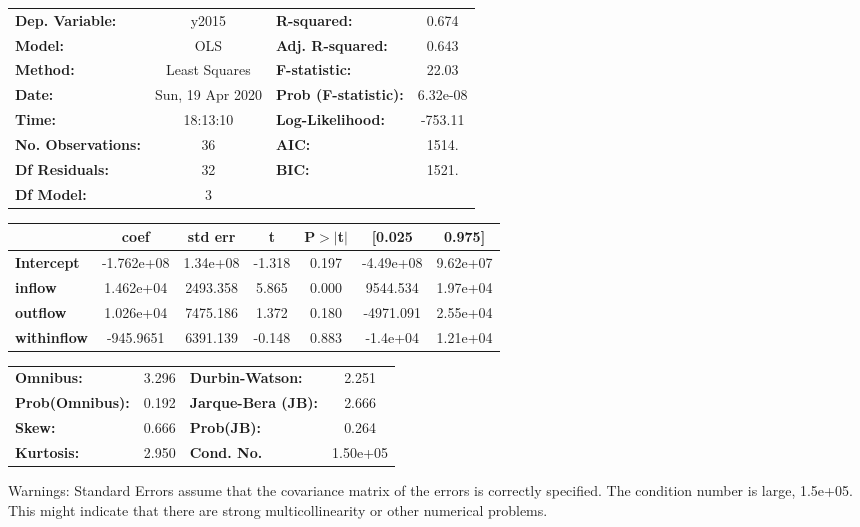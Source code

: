 \begin{center}
\begin{tabular}{lclc}
\toprule
\textbf{Dep. Variable:}    &      y2015       & \textbf{  R-squared:         } &     0.674   \\
\textbf{Model:}            &       OLS        & \textbf{  Adj. R-squared:    } &     0.643   \\
\textbf{Method:}           &  Least Squares   & \textbf{  F-statistic:       } &     22.03   \\
\textbf{Date:}             & Sun, 19 Apr 2020 & \textbf{  Prob (F-statistic):} &  6.32e-08   \\
\textbf{Time:}             &     18:13:10     & \textbf{  Log-Likelihood:    } &   -753.11   \\
\textbf{No. Observations:} &          36      & \textbf{  AIC:               } &     1514.   \\
\textbf{Df Residuals:}     &          32      & \textbf{  BIC:               } &     1521.   \\
\textbf{Df Model:}         &           3      & \textbf{                     } &             \\
\bottomrule
\end{tabular}
\begin{tabular}{lcccccc}
                    & \textbf{coef} & \textbf{std err} & \textbf{t} & \textbf{P$> |$t$|$} & \textbf{[0.025} & \textbf{0.975]}  \\
\midrule
\textbf{Intercept}  &   -1.762e+08  &     1.34e+08     &    -1.318  &         0.197        &    -4.49e+08    &     9.62e+07     \\
\textbf{inflow}     &    1.462e+04  &     2493.358     &     5.865  &         0.000        &     9544.534    &     1.97e+04     \\
\textbf{outflow}    &    1.026e+04  &     7475.186     &     1.372  &         0.180        &    -4971.091    &     2.55e+04     \\
\textbf{withinflow} &    -945.9651  &     6391.139     &    -0.148  &         0.883        &     -1.4e+04    &     1.21e+04     \\
\bottomrule
\end{tabular}
\begin{tabular}{lclc}
\textbf{Omnibus:}       &  3.296 & \textbf{  Durbin-Watson:     } &    2.251  \\
\textbf{Prob(Omnibus):} &  0.192 & \textbf{  Jarque-Bera (JB):  } &    2.666  \\
\textbf{Skew:}          &  0.666 & \textbf{  Prob(JB):          } &    0.264  \\
\textbf{Kurtosis:}      &  2.950 & \textbf{  Cond. No.          } & 1.50e+05  \\
\bottomrule
\end{tabular}
\end{center}

Warnings: \newline
 [1] Standard Errors assume that the covariance matrix of the errors is correctly specified. \newline
 [2] The condition number is large, 1.5e+05. This might indicate that there are \newline
 strong multicollinearity or other numerical problems.